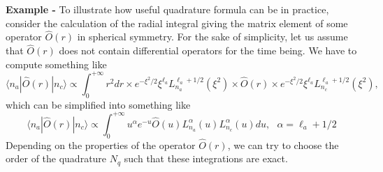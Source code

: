 \documentclass[letterpaper,12pt]{article}
\begin{document}

{\bf Example - } To illustrate how useful quadrature formula can be in practice, consider the calculation of the radial integral giving the matrix element of some operator $\hat{O}(r)$ in spherical symmetry. For the sake of simplicity, let us assume that $\hat{O}(r)$ does not contain differential operators for the time being. We have to compute something like
\begin{equation}
\langle n_{a} | \hat{O}(r) | n_{c} \rangle 
\propto
\int_{0}^{+\infty} r^{2}dr  \times
e^{-\xi^{2}/2} \xi^{\ell_{a}} L_{n_{a}}^{\ell_{a}+1/2}(\xi^{2}) \times
\hat{O}(r) \times
e^{-\xi^{2}/2} \xi^{\ell_{a}} L_{n_{c}}^{\ell_{a}+1/2}(\xi^{2}),
\end{equation}
which can be simplified into something like
\begin{equation}
\langle n_{a} | \hat{O}(r) | n_{c} \rangle 
\propto
\int_{0}^{+\infty}   
u^{\alpha}e^{-u}
\hat{O}(u) L_{n_{a}}^{\alpha}(u) L_{n_{c}}^{\alpha}(u) du, \ \ \ \alpha=\ell_{a}+1/2
\end{equation}
Depending on the properties of the operator $\hat{O}(r)$, we can try to choose the order of the quadrature $N_{q}$ such that these integrations are exact.
\end{document}
